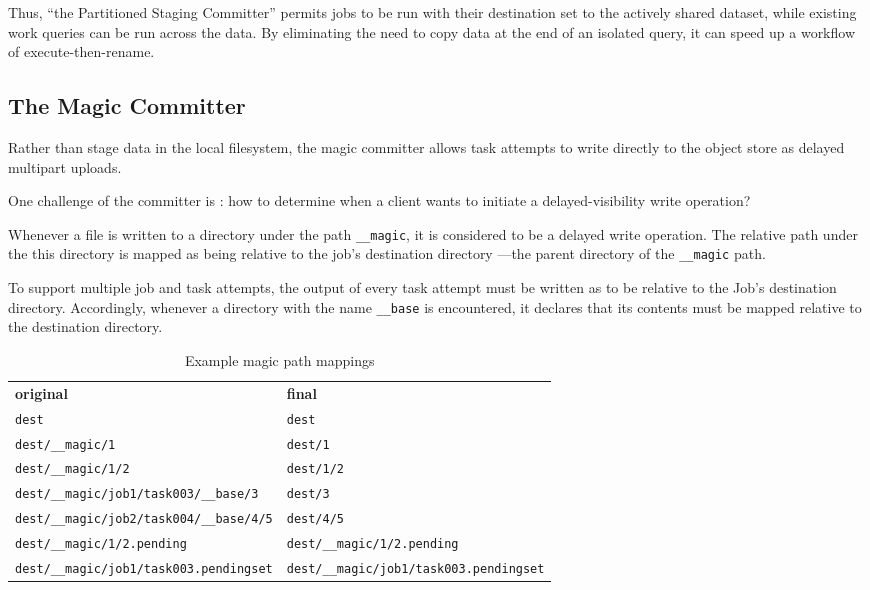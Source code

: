 \documentclass[conference]{IEEEtran}
\begin{document}
Thus, ``the Partitioned Staging Committer''
permits jobs to be run with their destination set to the actively
shared dataset, while existing work queries can be run across the data.
By eliminating the need to copy data at the end of an isolated query,
it can speed up a workflow of execute-then-rename.


\subsection{The Magic Committer}
\label{subsec:magic-committer}

Rather than stage data in the local filesystem, the magic committer
allows task attempts to write directly to the object store as
delayed multipart uploads.

One challenge of the committer is : how to determine when a client wants to initiate
a delayed-visibility write operation?


Whenever a file is written to a directory under the path \texttt{__magic},
it is considered to be a delayed write operation.
The relative path under the this directory is mapped as being relative to the
job's destination directory ---the parent directory of the \texttt{__magic} path.

To support multiple job and task attempts, the output of every task attempt
must be written as to be relative to the Job's destination directory.
Accordingly, whenever a directory with the name \texttt{__base} is
encountered, it declares that its contents must be mapped relative to the destination
directory.

\begin{table}
  \caption{Example magic path mappings}
  \begin{tabular}{ l l }
    \hline
    \textbf{original} & \textbf{final} \\
    \texttt{dest} & \texttt{dest} \\
    \texttt{dest/__magic/1} & \texttt{dest/1} \\
    \texttt{dest/__magic/1/2} & \texttt{dest/1/2} \\
    \texttt{dest/__magic/job1/task003/__base/3} & \texttt{dest/3} \\
    \texttt{dest/__magic/job2/task004/__base/4/5} & \texttt{dest/4/5} \\
    \texttt{dest/__magic/1/2.pending} & \texttt{dest/__magic/1/2.pending} \\
    \texttt{dest/__magic/job1/task003.pendingset} & \texttt{dest/__magic/job1/task003.pendingset} \\
    \hline
  \end{tabular}
\label{tab:magic-paths}
\end{table}
\end{document}
